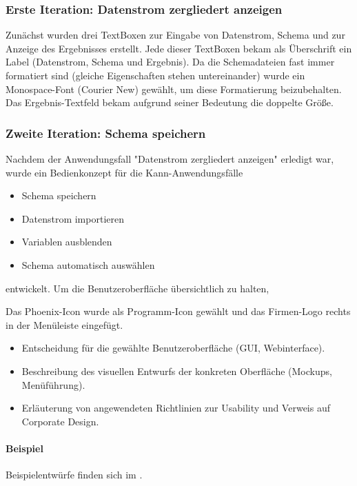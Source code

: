 \subsubsection{Erste Iteration: Datenstrom zergliedert anzeigen}
\label{sec:BenutzeroberflaecheZergliedern}


Zunächst wurden drei TextBoxen zur Eingabe von Datenstrom, Schema und zur Anzeige des Ergebnisses erstellt. Jede dieser TextBoxen bekam als Überschrift ein Label (Datenstrom, Schema und Ergebnis). Da die Schemadateien fast immer formatiert sind (gleiche Eigenschaften stehen untereinander) wurde ein Monospace-Font (Courier New) gewählt, um diese Formatierung beizubehalten. Das Ergebnis-Textfeld bekam aufgrund seiner Bedeutung die doppelte Größe.

\subsubsection{Zweite Iteration: Schema speichern}
\label{BenutzeroberflaecheSpeichern}
Nachdem der Anwendungsfall "Datenstrom zergliedert anzeigen" erledigt war, wurde ein Bedienkonzept für die Kann-Anwendungsfälle
\begin{itemize}
\item Schema speichern
\item Datenstrom importieren
\item Variablen ausblenden
\item Schema automatisch auswählen
\end{itemize}
entwickelt. Um die Benutzeroberfläche übersichtlich zu halten, 

Das Phoenix-Icon wurde als Programm-Icon gewählt und das Firmen-Logo rechts in der Menüleiste eingefügt.

\begin{itemize}
	\item Entscheidung für die gewählte Benutzeroberfläche (\zB GUI, Webinterface).
	\item Beschreibung des visuellen Entwurfs der konkreten Oberfläche (\zB Mockups, Menüführung).
	\item \Ggfs Erläuterung von angewendeten Richtlinien zur Usability und Verweis auf Corporate Design.
\end{itemize}



\paragraph{Beispiel}
Beispielentwürfe finden sich im .


